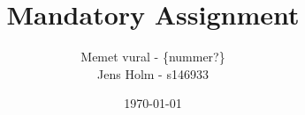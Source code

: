 

\title{Mandatory Assignment}
\date{\today}
\author{Memet vural - \{nummer?\}\\ Jens Holm - s146933}



\maketitle

\tableofcontents















